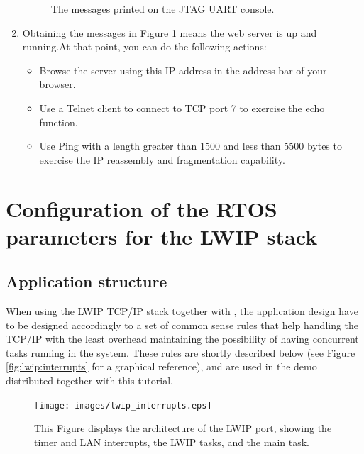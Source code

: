 \begin{enumerate}
\begin{figure}
\caption{\label{fig:lwip-console}The messages printed on the JTAG UART
console.}
\end{figure}
%
\item Obtaining the messages in Figure \ref{fig:lwip-console} means
  the web server is up and running.At that point, you can do the
  following actions:
  \begin{itemize}
    \item Browse the server using this IP address in the address bar
      of your browser.
    \item Use a Telnet client to connect to TCP port 7 to exercise the
      echo function.
    \item Use Ping with a length greater than 1500 and less than 5500
      bytes to exercise the IP reassembly and fragmentation
      capability.
  \end{itemize}
\end{enumerate}



\chapter{Configuration of the RTOS parameters for the LWIP stack}
\label{cha:Advanced-configuration}

\section{Application structure}

When using the LWIP TCP/IP stack together with \ee, the
application design have to be designed accordingly to a set of common
sense rules that help handling the TCP/IP with the least overhead
maintaining the possibility of having concurrent tasks running in the
system. These rules are shortly described below (see Figure
\ref{fig:lwip:interrupts} for a graphical reference), and are used in
the demo distributed together with this tutorial.

%
\begin{figure}
\texttt{[image: images/lwip\_interrupts.eps]}
\caption{\label{fig:lwip-interrupts}This Figure displays the
architecture of the LWIP port, showing the timer and LAN interrupts,
the LWIP tasks, and the main task.}
\end{figure}

